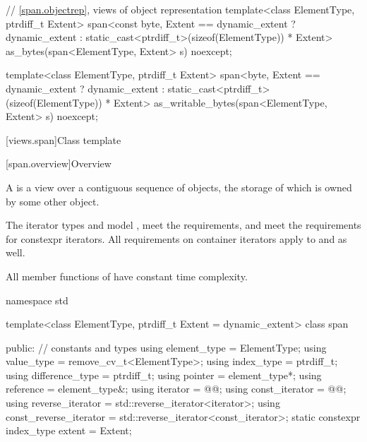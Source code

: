 \begin{codeblock}
\begin{codeblock}
\begin{codeblock}
\begin{codeblock}
{  // \ref{span.objectrep}, views of object representation
  template<class ElementType, ptrdiff_t Extent>
    span<const byte,
         Extent == dynamic_extent ? dynamic_extent
                                  : static_cast<ptrdiff_t>(sizeof(ElementType)) * Extent>
      as_bytes(span<ElementType, Extent> s) noexcept;

  template<class ElementType, ptrdiff_t Extent>
    span<byte,
         Extent == dynamic_extent ? dynamic_extent
                                  : static_cast<ptrdiff_t>(sizeof(ElementType)) * Extent>
      as_writable_bytes(span<ElementType, Extent> s) noexcept;
}
\end{codeblock}

[views.span]{Class template }

[span.overview]{Overview}

\pnum
{}%
A  is a view over a contiguous sequence of objects,
the storage of which is owned by some other object.

\pnum
The iterator types  and 
model ,
meet the 
requirements,
and
meet the requirements for
constexpr iterators.
All requirements on container iterators apply to
 and  as well.

\pnum
All member functions of  have constant time complexity.

%
\begin{codeblock}
namespace std {
  template<class ElementType, ptrdiff_t Extent = dynamic_extent>
  class span {
  public:
    // constants and types
    using element_type = ElementType;
    using value_type = remove_cv_t<ElementType>;
    using index_type = ptrdiff_t;
    using difference_type = ptrdiff_t;
    using pointer = element_type*;
    using reference = element_type&;
    using iterator = @@;
    using const_iterator = @@;
    using reverse_iterator = std::reverse_iterator<iterator>;
    using const_reverse_iterator = std::reverse_iterator<const_iterator>;
    static constexpr index_type extent = Extent;

}}
\end{codeblock}
\end{codeblock}
\end{codeblock}
\end{codeblock}
